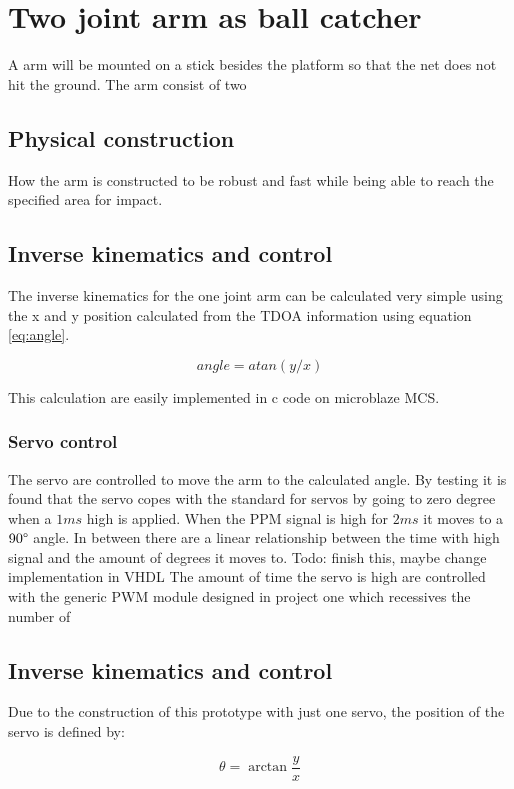 \chapter{Two joint arm as ball catcher}
\label{catcherArm}
	A arm will be mounted on a stick besides the platform so that the net does not hit the ground. The arm consist of two

\section{Physical construction}
\label{armConstruction}
	How the arm is constructed to be robust and fast while being able to reach the specified area for impact.

\section{Inverse kinematics and control }
\label{kinematics}
The inverse kinematics for the one joint arm can be calculated very simple using the x and y position calculated from the TDOA information using equation \ref{eq:angle}.

\begin{equation}
	angle = atan(y/x)
	\label{eq:angle}
\end{equation}

This calculation are easily implemented in c code on microblaze MCS. 

\subsection{Servo control}
The servo are controlled to move the arm to the calculated angle. By testing it is found that the servo copes with the standard for servos by going to zero degree when a $1\si{ms}$ high is applied. When the PPM signal is high for $2\si{ms}$ it moves to a $90\degree$ angle. In between there are a linear relationship between the time with high signal and the amount of degrees it moves to.
Todo: finish this, maybe change implementation in VHDL
The amount of time the servo is high are controlled with the generic PWM module designed in project one which recessives the number of   



	\section{Inverse kinematics and control}
	\label{kinematics}
		Due to the construction of this prototype with just one servo, the position of the servo is defined by:

		$$\theta = \arctan\frac{y}{x}$$
